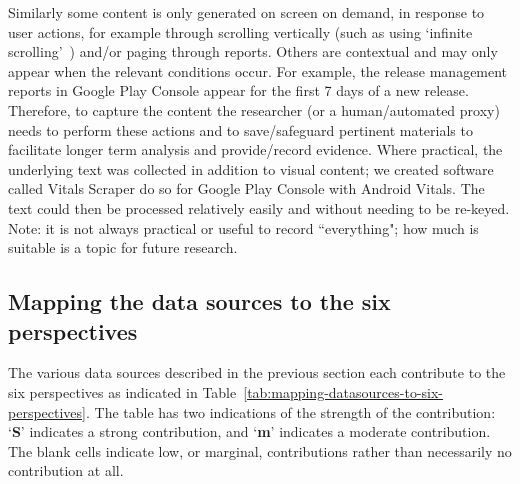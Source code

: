 Similarly some content is only generated on screen on demand, in response to user actions, for example through scrolling vertically (such as using `infinite scrolling'~) and/or paging through reports. Others are contextual and may only appear when the relevant conditions occur. For example, the release management reports in Google Play Console appear for the first 7 days of a new release. Therefore, to capture the content the researcher (or a human/automated proxy) needs to perform these actions and to save/safeguard pertinent materials to facilitate longer term analysis and provide/record evidence. Where practical, the underlying text was collected in addition to visual content; we created software called Vitals Scraper do so for Google Play Console with Android Vitals. The text could then be processed relatively easily and without needing to be re-keyed. Note: it is not always practical or useful to record ``everything"; how much is suitable is a topic for future research. 

\subsection{Mapping the data sources to the six perspectives}
The various data sources described in the previous section each contribute to the six perspectives as indicated in Table~\ref{tab:mapping-datasources-to-six-perspectives}. The table has two indications of the strength of the contribution: `\textbf{S}' indicates a strong contribution, and `\textbf{m}' indicates a moderate contribution. The blank cells indicate low, or marginal, contributions rather than necessarily no contribution at all.

